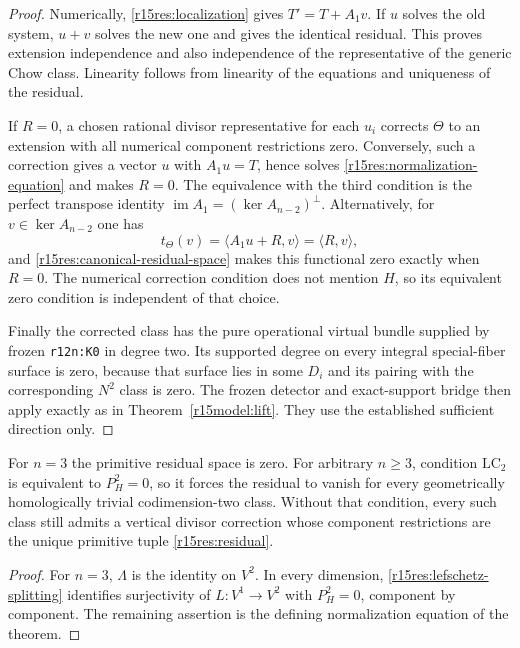 \begin{proof}
Numerically, \eqref{r15res:localization} gives
$T'=T+A_1v$.  If $u$ solves the old system, $u+v$ solves
the new one and gives the identical residual.  This proves
extension independence and also independence of the
representative of the generic Chow class.  Linearity follows
from linearity of the equations and uniqueness of the residual.

If $R=0$, a chosen rational divisor representative for each
$u_i$ corrects $\Theta$ to an extension with all numerical
component restrictions zero.  Conversely, such a correction
gives a vector $u$ with $A_1u=T$, hence solves
\eqref{r15res:normalization-equation} and makes $R=0$.
The equivalence with the third condition is the perfect
transpose identity
$\operatorname{im}A_1=(\ker A_{n-2})^\perp$.
Alternatively, for $v\in\ker A_{n-2}$ one has
\[
       t_\Theta(v)=\langle A_1u+R,v\rangle=\langle R,v\rangle,
\tag{NR15.17}\label{r15res:functional-realization}
\]
and \eqref{r15res:canonical-residual-space} makes this
functional zero exactly when $R=0$.
The numerical correction condition does not mention $H$,
so its equivalent zero condition is independent of that choice.

Finally the corrected class has the pure operational virtual
bundle supplied by frozen \texttt{r12n:K0} in degree two.
Its supported degree on every integral special-fiber surface
is zero, because that surface lies in some $D_i$ and its
pairing with the corresponding $N^2$ class is zero.
The frozen detector and exact-support bridge then apply
exactly as in Theorem~\ref{r15model:lift}.  They use the
established sufficient direction only.
\end{proof}

\begin{corollary}
\label{r15res:interpretation}
For $n=3$ the primitive residual space is zero.  For arbitrary
$n\geq3$, condition $\mathrm{LC}_2$ is equivalent to
$P_H^2=0$, so it forces the residual to vanish for every
geometrically homologically trivial codimension-two class.
Without that condition, every such class still admits a
vertical divisor correction whose component restrictions are
the unique primitive tuple \eqref{r15res:residual}.
\end{corollary}

\begin{proof}
For $n=3$, $\Lambda$ is the identity on $V^2$.
In every dimension, \eqref{r15res:lefschetz-splitting} identifies
surjectivity of $L:V^1\to V^2$ with $P_H^2=0$, component
by component.  The remaining assertion is the defining
normalization equation of the theorem.
\end{proof}

